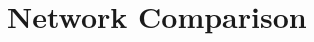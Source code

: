 \documentclass[lettersize,journal]{IEEEtran}
\newtheorem{remark}{Remark}
\begin{document}



\section{Network Comparison}
\label{sec:gw_comparison}
\end{document}
